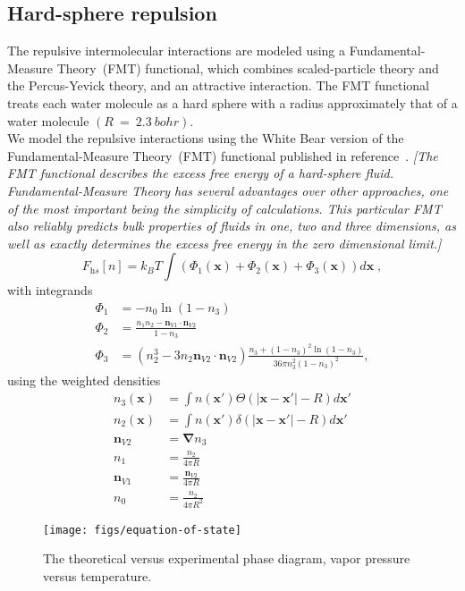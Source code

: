\documentclass[letterpaper,twocolumn,amsmath,amssymb,prb]{revtex4-1}
\newcommand{\xx}{\textbf{x}}
\newcommand{\needsworklater}[1]{\emph{[#1]}}
\begin{document}
\subsection{Hard-sphere repulsion}
The repulsive intermolecular interactions are modeled using a
Fundamental\nobreakdash-Measure Theory~\cite{rosenfeld1997}(FMT) functional,
which combines scaled-particle theory and the Percus-Yevick theory,
and an attractive interaction.  The FMT functional treats
each water molecule as a hard sphere with a radius approximately that of
a water molecule $(R~=~2.3~bohr)$.\\


We model the repulsive interactions using the White Bear version of
the Fundamental-Measure Theory~(FMT) functional published in
reference~\cite{roth2002whitebear}.  \needsworklater{The FMT
  functional describes the excess free energy of a hard-sphere
  fluid. Fundamental-Measure Theory has several advantages over other
  approaches, one of the most important being the simplicity of
  calculations.  This particular FMT also reliably predicts bulk
  properties of fluids in one, two and three dimensions, as well as
  exactly determines the excess free energy in the zero dimensional
  limit.}
\begin{equation}
F_\textit{hs}[n] = k_B T \int \left(\Phi_1(\xx) + \Phi_2(\xx) + \Phi_3(\xx)\right) d\xx \; ,
\end{equation}
with integrands
\begin{align}
\Phi_1 &= -n_0 \ln\left( 1 - n_3\right)\\
\Phi_2 &= \frac{n_1 n_2 - \mathbf{n}_{V1} \cdot\mathbf{n}_{V2}}{1-n_3} \\
\Phi_3 &= (n_2^3 - 3 n_2 \mathbf{n}_{V2} \cdot \mathbf{n}_{V2}) \frac{
  n_3 + (1-n_3)^2 \ln(1-n_3)
}{
  36\pi n_3^2\left( 1 - n_3 \right)^2
} ,
\end{align}
using the weighted densities
\begin{align}
  n_3(\xx) &= \int n(\xx') \Theta(\left|\xx - \xx'\right| - R) d\xx' \\
  n_2(\xx) &= \int n(\xx') \delta(\left|\xx - \xx'\right| - R) d\xx'
  \\
  \mathbf{n}_{V2} &= \mathbf{\nabla} n_3 \\
  n_1 &= \frac{n_2}{4\pi R}\\
  \mathbf{n}_{V1} &= \frac{\mathbf{n}_{V2}}{4\pi R}\\
  n_0 &= \frac{n_2}{4\pi R^2}
\end{align}


\begin{figure}
\begin{center}
\texttt{[image: figs/equation-of-state]}
\end{center}
\caption{The theoretical versus experimental phase diagram, vapor
  pressure versus temperature.  }
\label{fig:equation-of-state}
\end{figure}
\end{document}
